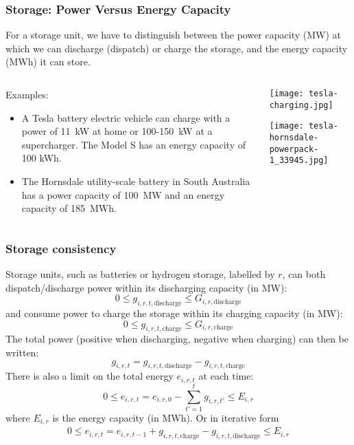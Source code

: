 \documentclass[10pt,aspectratio=169,dvipsnames]{beamer}
\let\olditem\item
\renewcommand{\item}{%
\olditem\vspace{5pt}}
\begin{document}
\begin{frame}
  \frametitle{Storage: Power Versus Energy Capacity}

  For a storage unit, we have to distinguish between the \alert{power capacity} (MW) at which we can discharge (dispatch) or charge the storage, and the \alert{energy capacity} (MWh) it can store.

  \begin{columns}[T]
    \begin{column}{7cm}

  Examples:
  \begin{itemize}
  \item A Tesla battery electric vehicle can charge with a power of 11~kW at home or 100-150~kW at a supercharger. The Model S has an energy capacity of 100 kWh.
    \item The Hornsdale utility-scale battery in South Australia has a power capacity of 100~MW and an energy capacity of 185~MWh.
  \end{itemize}

    \end{column}
    \begin{column}{6cm}

          \texttt{[image: tesla-charging.jpg]}

\texttt{[image: tesla-hornsdale-powerpack-1\_33945.jpg]}
    \end{column}
  \end{columns}
\end{frame}

\begin{frame}
  \frametitle{Storage consistency}

  Storage units, such as batteries or hydrogen storage, labelled by $r$, can both
  dispatch/discharge power within its discharging capacity (in MW):
  \begin{equation*}
    0 \leq g_{i,r,t,\textrm{discharge}} \leq G_{i,r,\textrm{discharge}}
  \end{equation*}
  and consume power to charge the storage within its charging capacity (in MW):
  \begin{equation*}
    0 \leq g_{i,r,t,\textrm{charge}} \leq G_{i,r,\textrm{charge}}
  \end{equation*}
  The total power (positive when discharging, negative when charging) can then be written:
  \begin{equation*}
    g_{i,r,t} = g_{i,r,t,\textrm{discharge}}  - g_{i,r,t,\textrm{charge}}
  \end{equation*}
  There is also a limit on the total energy $e_{i,r,t}$ at each time:
  \begin{equation*}
    0 \leq e_{i,r,t} = e_{i,r,0} -\sum_{t'=1}^{t} g_{i,r,t'} \leq E_{i,r}
  \end{equation*}
  where $E_{i,r}$ is the energy capacity (in MWh). Or in iterative form
  \begin{align*}
    0 \leq e_{i,r,t} = e_{i,r,t-1} + g_{i,r,t,\textrm{charge}} -  g_{i,r,t,\textrm{discharge}} \leq E_{i,r}
  \end{align*}

\end{frame}
\end{document}

